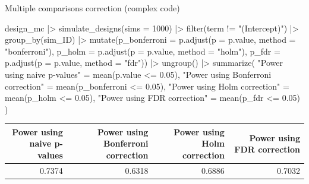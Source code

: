 \documentclass[
  11pt,
  ignorenonframetext,
]{beamer}
\newenvironment{Shaded}{\begin{snugshade}}{\end{snugshade}}
\newcommand{\AttributeTok}[1]{\textcolor[rgb]{0.40,0.45,0.13}{#1}}
\newcommand{\DecValTok}[1]{\textcolor[rgb]{0.68,0.00,0.00}{#1}}
\newcommand{\FloatTok}[1]{\textcolor[rgb]{0.68,0.00,0.00}{#1}}
\newcommand{\FunctionTok}[1]{\textcolor[rgb]{0.28,0.35,0.67}{#1}}
\newcommand{\NormalTok}[1]{\textcolor[rgb]{0.00,0.23,0.31}{#1}}
\newcommand{\OtherTok}[1]{\textcolor[rgb]{0.00,0.23,0.31}{#1}}
\newcommand{\SpecialCharTok}[1]{\textcolor[rgb]{0.37,0.37,0.37}{#1}}
\newcommand{\StringTok}[1]{\textcolor[rgb]{0.13,0.47,0.30}{#1}}
\begin{document}
\begin{frame}[fragile]{Multiple comparisons correction (complex code)}
\protect\hypertarget{multiple-comparisons-correction-complex-code-1}{}
\begin{Shaded}
\begin{Highlighting}[]
\NormalTok{design\_mc }\SpecialCharTok{|\textgreater{}}
  \FunctionTok{simulate\_designs}\NormalTok{(}\AttributeTok{sims =} \DecValTok{1000}\NormalTok{) }\SpecialCharTok{|\textgreater{}}
  \FunctionTok{filter}\NormalTok{(term }\SpecialCharTok{!=} \StringTok{"(Intercept)"}\NormalTok{) }\SpecialCharTok{|\textgreater{}}
  \FunctionTok{group\_by}\NormalTok{(sim\_ID) }\SpecialCharTok{|\textgreater{}}
  \FunctionTok{mutate}\NormalTok{(}\AttributeTok{p\_bonferroni =} \FunctionTok{p.adjust}\NormalTok{(}\AttributeTok{p =}\NormalTok{ p.value, }\AttributeTok{method =} \StringTok{"bonferroni"}\NormalTok{),}
         \AttributeTok{p\_holm =} \FunctionTok{p.adjust}\NormalTok{(}\AttributeTok{p =}\NormalTok{ p.value, }\AttributeTok{method =} \StringTok{"holm"}\NormalTok{),}
         \AttributeTok{p\_fdr =} \FunctionTok{p.adjust}\NormalTok{(}\AttributeTok{p =}\NormalTok{ p.value, }\AttributeTok{method =} \StringTok{"fdr"}\NormalTok{)) }\SpecialCharTok{|\textgreater{}}
  \FunctionTok{ungroup}\NormalTok{() }\SpecialCharTok{|\textgreater{}}
  \FunctionTok{summarize}\NormalTok{(}
    \StringTok{"Power using naive p{-}values"} \OtherTok{=} \FunctionTok{mean}\NormalTok{(p.value }\SpecialCharTok{\textless{}=} \FloatTok{0.05}\NormalTok{),}
    \StringTok{"Power using Bonferroni correction"} \OtherTok{=} \FunctionTok{mean}\NormalTok{(p\_bonferroni }\SpecialCharTok{\textless{}=} \FloatTok{0.05}\NormalTok{),}
    \StringTok{"Power using Holm correction"} \OtherTok{=} \FunctionTok{mean}\NormalTok{(p\_holm }\SpecialCharTok{\textless{}=} \FloatTok{0.05}\NormalTok{),}
    \StringTok{"Power using FDR correction"} \OtherTok{=} \FunctionTok{mean}\NormalTok{(p\_fdr }\SpecialCharTok{\textless{}=} \FloatTok{0.05}\NormalTok{)}
\NormalTok{    ) }
\end{Highlighting}
\end{Shaded}

\begin{tabular}{r|r|r|r}
\hline
Power using naive p-values & Power using Bonferroni correction & Power using Holm correction & Power using FDR correction\\
\hline
0.7374 & 0.6318 & 0.6886 & 0.7032\\
\hline
\end{tabular}
\end{frame}
\end{document}
